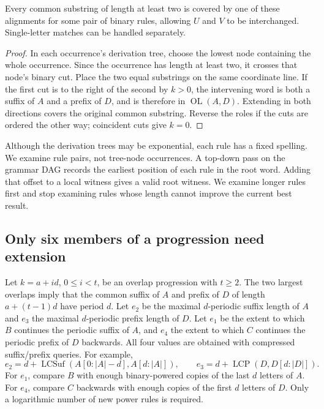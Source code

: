 \begin{lemma}
Every common substring of length at least two is covered by one of these
alignments for some pair of binary rules, allowing $U$ and $V$ to be
interchanged. Single-letter matches can be handled separately.
\end{lemma}
\begin{proof}
In each occurrence's derivation tree, choose the lowest node containing
the whole occurrence. Since the occurrence has length at least two, it
crosses that node's binary cut. Place the two equal substrings on the same
coordinate line. If the first cut is to the right of the second by $k>0$,
the intervening word is both a suffix of $A$ and a prefix of $D$, and is
therefore in $\operatorname{OL}(A,D)$. Extending in both directions covers
the original common substring. Reverse the roles if the cuts are ordered
the other way; coincident cuts give $k=0$.
\end{proof}

Although the derivation trees may be exponential, each rule has a fixed
spelling. We examine rule pairs, not tree-node occurrences. A top-down
pass on the grammar DAG records the earliest position of each rule in
the root word. Adding that offset to a local witness gives a valid root
witness. We examine longer rules first and stop examining rules whose
length cannot improve the current best result.

\subsection{Only six members of a progression need extension}

Let $k=a+id$, $0\le i<t$, be an overlap progression with $t\ge2$.
The two largest overlaps imply that the common suffix of $A$ and prefix
of $D$ of length $a+(t-1)d$ have period $d$. Let $e_2$ be the maximal
$d$-periodic suffix length of $A$ and $e_3$ the maximal $d$-periodic
prefix length of $D$. Let $e_1$ be the extent to which $B$ continues the
periodic suffix of $A$, and $e_4$ the extent to which $C$ continues the
periodic prefix of $D$ backwards. All four values are obtained with
compressed suffix/prefix queries. For example,
\[
 e_2=d+\operatorname{LCSuf}(A[0:|A|-d],A[d:|A|]),
 \qquad e_3=d+\operatorname{LCP}(D,D[d:|D|]).
\]
For $e_1$, compare $B$ with enough binary-powered copies of the last
$d$ letters of $A$. For $e_4$, compare $C$ backwards with enough copies
of the first $d$ letters of $D$. Only a logarithmic number of new power
rules is required.

